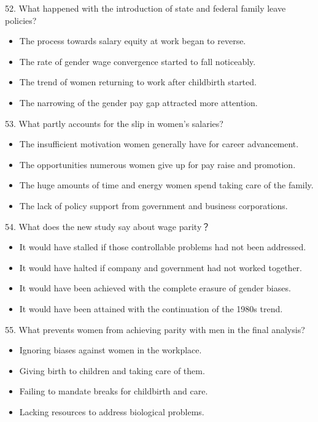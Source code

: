 \documentclass[UTF8,11pt]{ctexart}
\begin{document}
52. What happened with the introduction of state and federal family leave policies?


\begin{itemize}[leftmargin=2em,itemsep=.2em,topsep=.4em]\item[A.] The process towards salary equity at work began to reverse.
\item[B.] The rate of gender wage convergence started to fall noticeably.
\item[C.] The trend of women returning to work after childbirth started.
\item[D.] The narrowing of the gender pay gap attracted more attention.
\end{itemize}

53. What partly accounts for the slip in women’s salaries?


\begin{itemize}[leftmargin=2em,itemsep=.2em,topsep=.4em]\item[A.] The insufficient motivation women generally have for career advancement.
\item[B.] The opportunities numerous women give up for pay raise and promotion.
\item[C.] The huge amounts of time and energy women spend taking care of the family.
\item[D.] The lack of policy support from government and business corporations.
\end{itemize}

54. What does the new study say about wage parity？


\begin{itemize}[leftmargin=2em,itemsep=.2em,topsep=.4em]\item[A.] It would have stalled if those controllable problems had not been addressed.
\item[B.] It would have halted if company and government had not worked together.
\item[C.] It would have been achieved with the complete erasure of gender biases.
\item[D.] It would have been attained with the continuation of the 1980s trend.
\end{itemize}

55. What prevents women from achieving parity with men in the final analysis?


\begin{itemize}[leftmargin=2em,itemsep=.2em,topsep=.4em]\item[A.] Ignoring biases against women in the workplace.
\item[B.] Giving birth to children and taking care of them.
\item[C.] Failing to mandate breaks for childbirth and care.
\item[D.] Lacking resources to address biological problems.
\end{itemize}
\end{document}

